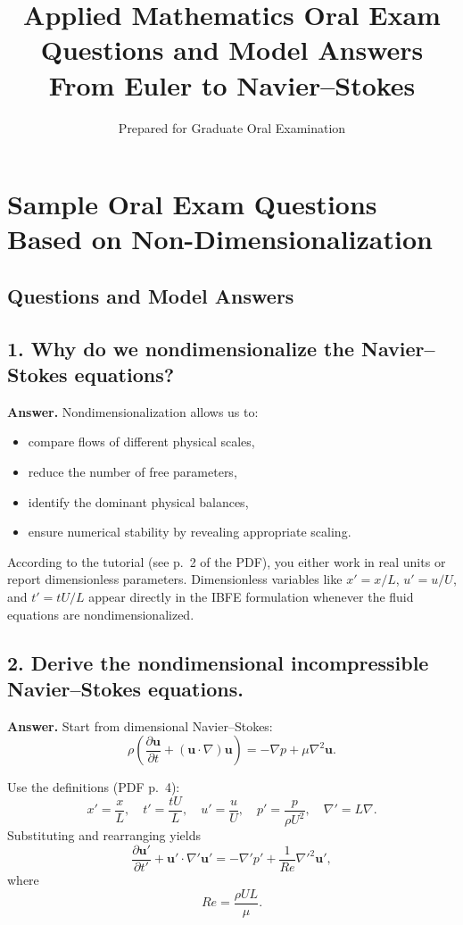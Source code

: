 \documentclass[12pt]{article}
\title{\vspace{-2em}\textbf{Applied Mathematics Oral Exam Questions and Model Answers}\\
\large From Euler to Navier--Stokes}
\author{Prepared for Graduate Oral Examination}
\date{}
\begin{document}
\section*{Sample Oral Exam Questions Based on Non-Dimensionalization}
\subsection*{Questions and Model Answers}

\subsection*{1. Why do we nondimensionalize the Navier--Stokes equations?}

\textbf{Answer.}
Nondimensionalization allows us to:
\begin{itemize}
    \item compare flows of different physical scales,
    \item reduce the number of free parameters,
    \item identify the dominant physical balances,
    \item ensure numerical stability by revealing appropriate scaling.
\end{itemize}
According to the tutorial (see p.~2 of the PDF), you either work in real units
or report dimensionless parameters. Dimensionless variables like
$x' = x/L$, $u'=u/U$, and $t'=tU/L$ appear directly in the IBFE formulation
whenever the fluid equations are nondimensionalized.


\subsection*{2. Derive the nondimensional incompressible Navier--Stokes equations.}

\textbf{Answer.}
Start from dimensional Navier--Stokes:
\[
\rho\left(
\frac{\partial \mathbf{u}}{\partial t} + (\mathbf{u}\cdot\nabla)\mathbf{u}
\right)
= -\nabla p + \mu\nabla^2\mathbf{u}.
\]

Use the definitions (PDF p.~4):
\[
x'=\frac{x}{L},\quad t'=\frac{tU}{L},\quad u'=\frac{u}{U},
\quad p'=\frac{p}{\rho U^2},\quad \nabla'=L\nabla.
\]
Substituting and rearranging yields
\[
\frac{\partial \mathbf{u}'}{\partial t'}
+ \mathbf{u}'\cdot\nabla'\mathbf{u}'
= -\nabla' p' + \frac{1}{Re}\nabla'^2\mathbf{u}',
\]
where
\[
Re = \frac{\rho UL}{\mu}.
\]
\end{document}
